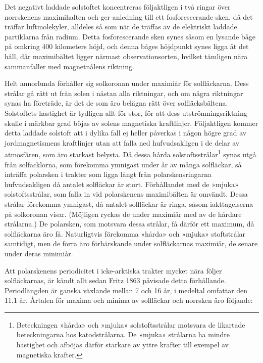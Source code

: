 \documentclass[a4paper, 12pt, oneside, swedish]{article}
\begin{document}
Det negativt laddade solstoftet koncentreras följaktligen i två ringar över norrskenens maximihalten och ger anledning till ett fosforescerande sken, då det träffar luftmolekyler, alldeles så som när de träffas av de elektriskt laddade partiklarna från radium. Detta fosforescerande sken synes såsom en lysande båge på omkring 400 kilometers höjd, och denna båges höjdpunkt synes ligga åt det håll, där maximibältet ligger närmast observationsorten, hvilket tämligen nära sammanfaller med magnetnålens riktning.

Helt annorlunda förhåller sig solkoronan under maximiår för solfläckarna. Dess strålar gå rätt ut från solen i nästan alla riktningar, och om några riktningar synas ha företräde, är det de som äro belägna rätt över solfläcksbältena. Solstoftets hastighet är tydligen allt för stor, för att dess utströmningsriktning skulle i märkbar grad böjas av solens magnetiska kraftlinjer. Följaktligen kommer detta laddade solstoft att i dylika fall ej heller påverkas i någon högre grad av jordmagnetismens kraftlinjer utan att falla ned hufvudsakligen i de delar av atmosfären, som äro starkast belysta. Då dessa hårda solstoftsstrålar\footnote{Beteckningen »hårda» och »mjuka» solstoftsstrålar motsvara de likartade beteckningarna hos katodstrålarna. De »mjuka» strålarna ha mindre hastighet och afböjas därför starkare av yttre krafter till exempel av magnetiska krafter.} synas utgå från solfacklorna, som förekomma ymnigast under år av många solfläckar, så inträffa polarsken i trakter som ligga långt från polarskensringarna hufvudsakligen då antalet solfläckar är stort. Förhållandet med de »mjuka» solstoftsstrålar, som falla in vid polarskenens maximibälten är omvändt. Dessa strålar förekomma ymnigast, då antalet solfläckar är ringa, såsom iakttagelserna på solkoronan visar. (Möjligen ryckas de under maximiår med av de hårdare strålarna.) De polarsken, som motsvara dessa strålar, få därför ett maximum, då solfläckarna äro få. Naturligtvis förekomma »hårda» och »mjuka» stoftstrålar samtidigt, men de förra äro förhärskande under solfläckarnas maximiår, de senare under deras minimiår.

Att polarskenens periodicitet i icke-arktiska trakter mycket nära följer solfläckarnas, är kändt allt sedan Fritz 1863 påvisade detta förhållande. Periodlängden är ganska växlande mellan 7 och 16 år, i medeltal omfattar den 11,1 år. Årtalen för maxima och minima av solfläckar och norrsken äro följande:
\end{document}

